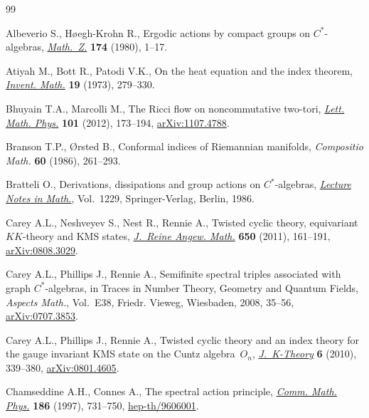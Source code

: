 \documentclass[pdftex]{sigma}
\numberwithin{equation}{section}
\begin{document}
\begin{thebibliography}{99}
\footnotesize\itemsep=0pt

Albeverio S., H{\o}egh-Krohn R., Ergodic actions by compact groups on
 {$C^{\ast} $}-algebras, \href{http://dx.doi.org/10.1007/BF01215076}{\textit{Math.~Z.}} \textbf{174} (1980), 1--17.

Atiyah M., Bott R., Patodi V.K., On the heat equation and the index theorem,
 \href{http://dx.doi.org/10.1007/BF01425417}{\textit{Invent. Math.}} \textbf{19} (1973), 279--330.

Bhuyain T.A., Marcolli M., The {R}icci f\/low on noncommutative two-tori,
 \href{http://dx.doi.org/10.1007/s11005-012-0550-0}{\textit{Lett. Math. Phys.}} \textbf{101} (2012), 173--194, \href{http://arxiv.org/abs/1107.4788}{arXiv:1107.4788}.

Branson T.P., {\O}rsted B., Conformal indices of {R}iemannian manifolds,
 \textit{Compositio Math.} \textbf{60} (1986), 261--293.

Bratteli O., Derivations, dissipations and group actions on {$C^*$}-algebras,
 \href{http://dx.doi.org/10.1007/BFb0098817}{\textit{Lecture Notes in Math.}}, Vol.~1229, Springer-Verlag, Berlin, 1986.

Carey A.L., Neshveyev S., Nest R., Rennie A., Twisted cyclic theory,
 equivariant {$KK$}-theory and {KMS} states, \href{http://dx.doi.org/10.1515/CRELLE.2011.007}{\textit{J.~Reine Angew. Math.}}
 \textbf{650} (2011), 161--191, \href{http://arxiv.org/abs/0808.3029}{arXiv:0808.3029}.

Carey A.L., Phillips J., Rennie A., Semif\/inite spectral triples associated with
 graph {$C^\ast$}-algebras, in Traces in Number Theory, Geometry and Quantum
 Fields, \textit{Aspects Math.}, Vol.~E38, Friedr. Vieweg, Wiesbaden, 2008,
 35--56, \href{http://arxiv.org/abs/0707.3853}{arXiv:0707.3853}.

Carey A.L., Phillips J., Rennie A., Twisted cyclic theory and an index theory
 for the gauge invariant {KMS} state on the {C}untz algebra~{$O_n$},
 \href{http://dx.doi.org/10.1017/is009010003jkt092}{\textit{J.~K-Theory}} \textbf{6} (2010), 339--380, \href{http://arxiv.org/abs/0801.4605}{arXiv:0801.4605}.

Chamseddine A.H., Connes A., The spectral action principle, \href{http://dx.doi.org/10.1007/s002200050126}{\textit{Comm. Math.
 Phys.}} \textbf{186} (1997), 731--750, \href{http://arxiv.org/abs/hep-th/9606001}{hep-th/9606001}.


\end{thebibliography}
\end{document}
